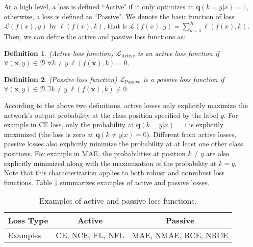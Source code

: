 \documentclass{article}
\newtheorem{definition}{Definition}
\def \xx {{\bm{x}}}
\def \qq {{\bm{q}}}
\def \L  {\mathcal{L}}
\def \D  {\mathcal{D}}
\begin{document}
At a high level, a loss is defined ``Active" if it only optimizes at $\qq(k = y|x)=1$, otherwise, a loss is defined as ``Passive". We denote the basic function of loss $\L(f(x), y)$ by $\ell(f(x), k)$, that is $\L(f(x), y) = \sum_{k=1}^{K} \ell(f(x), k)$. Then, we can define the active and passive loss functions as:


\begin{definition}{(Active loss function)}
$\L_{\text{Active}}$ is an active loss function if $\forall (\xx, y) \in \D \; \forall k \neq y \;\ell(f(\xx), k) = 0$.
\end{definition}

\begin{definition}{(Passive loss function)}
$\L_{\text{Passive}}$ is a passive loss function if
$\forall (\xx, y) \in \D \; \exists k \neq y \; \ell(f(\xx), k) \neq 0 $.
\end{definition}


According to the above two definitions, active losses only explicitly maximize the network's output probability at the class position specified by the label $y$. For example in CE loss, only the probability at $\qq(k=y|x)=1$ is explicitly maximized (the loss is zero at $\qq(k \neq y|x)=0$). Different from active losses, passive losses also explicitly minimize the probability at at least one other class positions. For example in MAE, the probabilities at position $k \neq y$ are also explicitly minimized along with 
the maximization of the probability at $k=y$. Note that this characterization applies to both robust and nonrobust loss functions. Table \ref{tab:summary} summarizes examples of active and passive losses.


\begin{table}[!ht]
\vspace{-0.1 in}
\caption{Examples of active and passive loss functions.}
\label{tab:summary}
\centering
\begin{adjustbox}{width=1\linewidth}
\small
\begin{tabular}{l|c|c}
\hline
Loss Type & Active & Passive \\ \hline
 Examples & CE, NCE, FL, NFL & MAE, NMAE, RCE, NRCE \\
 \hline
\end{tabular}
\end{adjustbox}
\vspace{-0.1 in}
\end{table}
\end{document}
